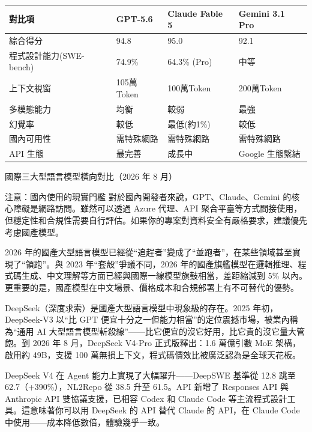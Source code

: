 \begin{center}
\begin{tabularx}{\linewidth}{|X|X|X|X|}
\hline
\textbf{對比項} & \textbf{GPT-5.6} & \textbf{Claude Fable 5} & \textbf{Gemini 3.1 Pro} \tabularnewline
\hline
綜合得分 & 94.8 & 95.0 & 92.1 \tabularnewline
程式設計能力(SWE-bench) & 74.9\% & 64.3\% (Pro) & 中等 \tabularnewline
上下文視窗 & 105萬Token & 100萬Token & 200萬Token \tabularnewline
多模態能力 & 均衡 & 較弱 & 最強 \tabularnewline
幻覺率 & 較低 & 最低(約1\%) & 較低 \tabularnewline
國內可用性 & 需特殊網路 & 需特殊網路 & 需特殊網路 \tabularnewline
API 生態 & 最完善 & 成長中 & Google 生態繫結 \tabularnewline
\hline
\end{tabularx}
\end{center}

\begin{center}\small\color{gray}國際三大型語言模型橫向對比（2026 年 8 月）\end{center}

\begin{tcbwarn}{注意：國內使用的現實門檻}
對於國內開發者來說，GPT、Claude、Gemini 的核心障礙是網路訪問。雖然可以透過 Azure 代理、API 聚合平臺等方式間接使用，但穩定性和合規性需要自行評估。如果你的專案對資料安全有嚴格要求，建議優先考慮國產模型。

\end{tcbwarn}


2026 年的國產大型語言模型已經從“追趕者”變成了“並跑者”，在某些領域甚至實現了“領跑”。與 2023 年“套殼”爭議不同，2026 年的國產旗艦模型在邏輯推理、程式碼生成、中文理解等方面已經與國際一線模型旗鼓相當，差距縮減到 5\% 以內。更重要的是，國產模型在中文場景、價格成本和合規部署上有不可替代的優勢。


DeepSeek（深度求索）是國產大型語言模型中現象級的存在。2025 年初，DeepSeek-V3 以“比 GPT 便宜十分之一但能力相當”的定位震撼市場，被業內稱為“通用 AI 大型語言模型斬殺線”——比它便宜的沒它好用，比它貴的沒它量大管飽。到 2026 年 8 月，DeepSeek V4-Pro 正式版釋出：1.6 萬億引數 MoE 架構，啟用約 49B，支援 100 萬無損上下文，程式碼價效比被廣泛認為是全球天花板。

DeepSeek V4 在 Agent 能力上實現了大幅躍升——DeepSWE 基準從 12.8 跳至 62.7（+390\%），NL2Repo 從 38.5 升至 61.5。API 新增了 Responses API 與 Anthropic API 雙協議支援，已相容 Codex 和 Claude Code 等主流程式設計工具。這意味著你可以用 DeepSeek 的 API 替代 Claude 的 API，在 Claude Code 中使用——成本降低數倍，體驗幾乎一致。

